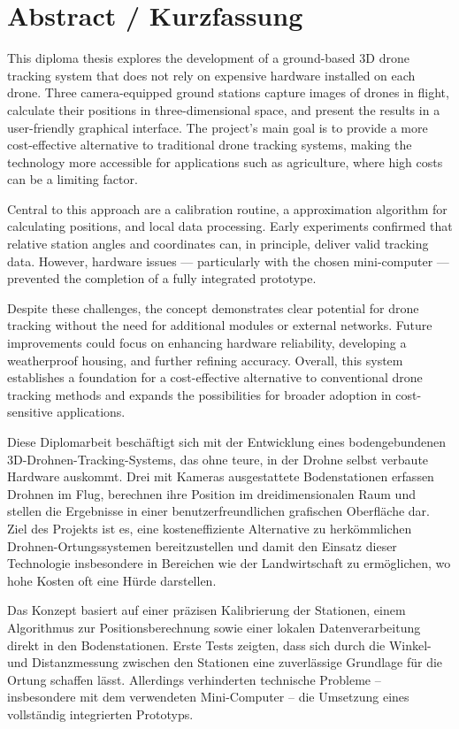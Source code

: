 \chapter*{Abstract / Kurzfassung}
\label{cha:abstract}

This diploma thesis explores the development of a ground-based 3D drone tracking system that does not rely on expensive hardware installed on each drone. Three camera-equipped ground stations capture images of drones in flight, calculate their positions in three-dimensional space, and present the results in a user-friendly graphical interface. The project’s main goal is to provide a more cost-effective alternative to traditional drone tracking systems, making the technology more accessible for applications such as agriculture, where high costs can be a limiting factor.

Central to this approach are a calibration routine, a approximation algorithm for calculating positions, and local data processing. Early experiments confirmed that relative station angles and coordinates can, in principle, deliver valid tracking data. However, hardware issues — particularly with the chosen mini-computer — prevented the completion of a fully integrated prototype.

Despite these challenges, the concept demonstrates clear potential for drone tracking without the need for additional modules or external networks. Future improvements could focus on enhancing hardware reliability, developing a weatherproof housing, and further refining accuracy. Overall, this system establishes a foundation for a cost-effective alternative to conventional drone tracking methods and expands the possibilities for broader adoption in cost-sensitive applications.

\vspace{1cm}

Diese Diplomarbeit beschäftigt sich mit der Entwicklung eines bodengebundenen 3D-Drohnen-Tracking-Systems, das ohne teure, in der Drohne selbst verbaute Hardware auskommt. Drei mit Kameras ausgestattete Bodenstationen erfassen Drohnen im Flug, berechnen ihre Position im dreidimensionalen Raum und stellen die Ergebnisse in einer benutzerfreundlichen grafischen Oberfläche dar. Ziel des Projekts ist es, eine kosteneffiziente Alternative zu herkömmlichen Drohnen-Ortungssystemen bereitzustellen und damit den Einsatz dieser Technologie insbesondere in Bereichen wie der Landwirtschaft zu ermöglichen, wo hohe Kosten oft eine Hürde darstellen.

Das Konzept basiert auf einer präzisen Kalibrierung der Stationen, einem Algorithmus zur Positionsberechnung sowie einer lokalen Datenverarbeitung direkt in den Bodenstationen. Erste Tests zeigten, dass sich durch die Winkel- und Distanzmessung zwischen den Stationen eine zuverlässige Grundlage für die Ortung schaffen lässt. Allerdings verhinderten technische Probleme – insbesondere mit dem verwendeten Mini-Computer – die Umsetzung eines vollständig integrierten Prototyps.

